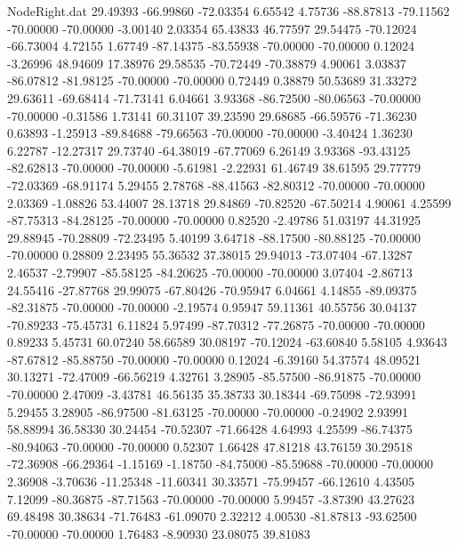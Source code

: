 \begin{filecontents}{NodeRight.dat}
  29.49393  -66.99860  -72.03354     6.65542    4.75736  -88.87813  -79.11562  -70.00000  -70.00000   -3.00140    2.03354   65.43833   46.77597
  29.54475  -70.12024  -66.73004     4.72155    1.67749  -87.14375  -83.55938  -70.00000  -70.00000    0.12024   -3.26996   48.94609   17.38976
  29.58535  -70.72449  -70.38879     4.90061    3.03837  -86.07812  -81.98125  -70.00000  -70.00000    0.72449    0.38879   50.53689   31.33272
  29.63611  -69.68414  -71.73141     6.04661    3.93368  -86.72500  -80.06563  -70.00000  -70.00000   -0.31586    1.73141   60.31107   39.23590
  29.68685  -66.59576  -71.36230     0.63893   -1.25913  -89.84688  -79.66563  -70.00000  -70.00000   -3.40424    1.36230    6.22787  -12.27317
  29.73740  -64.38019  -67.77069     6.26149    3.93368  -93.43125  -82.62813  -70.00000  -70.00000   -5.61981   -2.22931   61.46749   38.61595
  29.77779  -72.03369  -68.91174     5.29455    2.78768  -88.41563  -82.80312  -70.00000  -70.00000    2.03369   -1.08826   53.44007   28.13718
  29.84869  -70.82520  -67.50214     4.90061    4.25599  -87.75313  -84.28125  -70.00000  -70.00000    0.82520   -2.49786   51.03197   44.31925
  29.88945  -70.28809  -72.23495     5.40199    3.64718  -88.17500  -80.88125  -70.00000  -70.00000    0.28809    2.23495   55.36532   37.38015
  29.94013  -73.07404  -67.13287     2.46537   -2.79907  -85.58125  -84.20625  -70.00000  -70.00000    3.07404   -2.86713   24.55416  -27.87768
  29.99075  -67.80426  -70.95947     6.04661    4.14855  -89.09375  -82.31875  -70.00000  -70.00000   -2.19574    0.95947   59.11361   40.55756
  30.04137  -70.89233  -75.45731     6.11824    5.97499  -87.70312  -77.26875  -70.00000  -70.00000    0.89233    5.45731   60.07240   58.66589
  30.08197  -70.12024  -63.60840     5.58105    4.93643  -87.67812  -85.88750  -70.00000  -70.00000    0.12024   -6.39160   54.37574   48.09521
  30.13271  -72.47009  -66.56219     4.32761    3.28905  -85.57500  -86.91875  -70.00000  -70.00000    2.47009   -3.43781   46.56135   35.38733
  30.18344  -69.75098  -72.93991     5.29455    3.28905  -86.97500  -81.63125  -70.00000  -70.00000   -0.24902    2.93991   58.88994   36.58330
  30.24454  -70.52307  -71.66428     4.64993    4.25599  -86.74375  -80.94063  -70.00000  -70.00000    0.52307    1.66428   47.81218   43.76159
  30.29518  -72.36908  -66.29364    -1.15169   -1.18750  -84.75000  -85.59688  -70.00000  -70.00000    2.36908   -3.70636  -11.25348  -11.60341
  30.33571  -75.99457  -66.12610     4.43505    7.12099  -80.36875  -87.71563  -70.00000  -70.00000    5.99457   -3.87390   43.27623   69.48498
  30.38634  -71.76483  -61.09070     2.32212    4.00530  -81.87813  -93.62500  -70.00000  -70.00000    1.76483   -8.90930   23.08075   39.81083

\end{filecontents}
